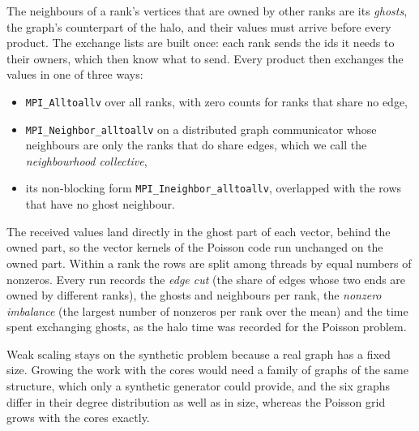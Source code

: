 \documentclass[10pt,a4paper]{article}
\newcommand{\code}[1]{\texttt{#1}}
\newcommand{\term}[1]{\emph{#1}}%
\begin{document}
The neighbours of a rank's vertices that are owned by other ranks are its \term{ghosts}, the graph's counterpart of the
halo, and their values must arrive before every product. The exchange lists are built once: each rank sends the ids it
needs to their owners, which then know what to send. Every product then exchanges the values in one of three ways:
\begin{itemize}
\item \code{MPI\_Alltoallv} over all ranks, with zero counts for ranks that share no edge,
\item \code{MPI\_Neighbor\_alltoallv} on a distributed graph communicator whose neighbours are only the ranks that do
share edges, which we call the \term{neighbourhood collective},
\item its non-blocking form \code{MPI\_Ineighbor\_alltoallv}, overlapped with the rows that have no ghost neighbour.
\end{itemize}
The received values land directly in the ghost part of each vector, behind the owned part, so the vector kernels of the
Poisson code run unchanged on the owned part. Within a rank the rows are split among threads by equal numbers of
nonzeros. Every run records the \term{edge cut} (the share of edges whose two ends are owned by different ranks), the
ghosts and neighbours per rank, the \term{nonzero imbalance} (the largest number of nonzeros per rank over the mean) and
the time spent exchanging ghosts, as the halo time was recorded for the Poisson problem.

Weak scaling stays on the synthetic problem because a real graph has a fixed size. Growing the work with the cores
would need a family of graphs of the same structure, which only a synthetic generator could provide, and the six graphs
differ in their degree distribution as well as in size, whereas the Poisson grid grows with the cores exactly.
\end{document}

